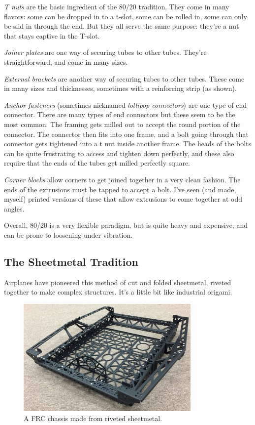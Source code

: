 \documentclass[10pt,letterpaper]{book}
\begin{document}
	\begin{asparaenum}[a)]
		\item \textit{T nuts} are the basic ingredient of the 80/20 tradition. They come in many flavors: some can be dropped in to a t-slot, some can be rolled in, some can only be slid in through the end. But they all serve the same purpose: they're a nut that stays captive in the T-slot.
		\item \textit{Joiner plates} are one way of securing tubes to other tubes. They're straightforward, and come in many sizes.
		\item \textit{External brackets} are another way of securing tubes to other tubes. These come in many sizes and thicknesses, sometimes with a reinforcing strip (as shown).
		\item \textit{Anchor fasteners} (sometimes nicknamed \textit{lollipop connectors}) are one type of end connector. There are many types of end connectors but these seem to be the most common. The framing gets milled out to accept the round portion of the connector. The connector then fits into one frame, and a bolt going through that connector gets tightened into a t nut inside another frame. The heads of the bolts can be quite frustrating to access and tighten down perfectly, and these also require that the ends of the tubes get milled perfectly square.
		\item \textit{Corner blocks} allow corners to get joined together in a very clean fashion. The ends of the extrusions must be tapped to accept a bolt. I've seen (and made, myself) printed versions of these that allow extrusions to come together at odd angles.
	\end{asparaenum}
	
	Overall, 80/20 is a very flexible paradigm, but is quite heavy and expensive, and can be prone to loosening under vibration.
	
	\subsection{The Sheetmetal Tradition}
	Airplanes have pioneered this method of cut and folded sheetmetal, riveted together to make complex structures. It's a little bit like industrial origami. 
	
	\begin{figure}[H]
		\includegraphics[width=0.8\textwidth]{imgs/tradition_sheetmetal_148.png}
		\caption{A FRC chassis made from riveted sheetmetal.}
	\end{figure}
	
\end{document}
